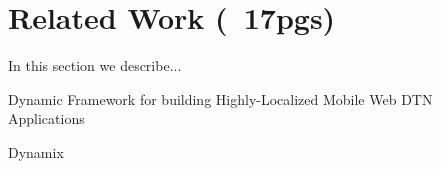 
%
%

\section{Related Work (~17pgs)}
\label{related_work}
In this section we describe...
\begin{description}
  \item[Dynamic Framework for building Highly-Localized Mobile Web DTN Applications]
  \cite{Sankaran2014}
  \item[Dynamix]
  \cite{Carlson2012}
\end{description}
